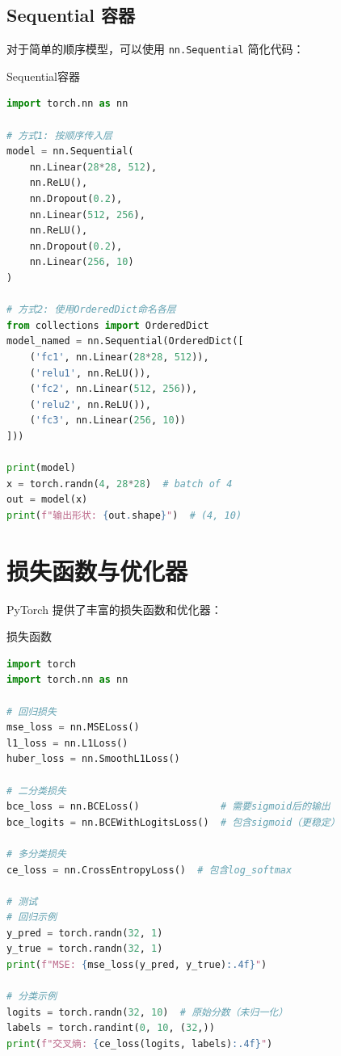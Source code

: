 \subsection{Sequential 容器}

对于简单的顺序模型，可以使用 \texttt{nn.Sequential} 简化代码：

\begin{mycode}{Sequential容器}
\begin{lstlisting}[language=Python]
import torch.nn as nn

# 方式1: 按顺序传入层
model = nn.Sequential(
    nn.Linear(28*28, 512),
    nn.ReLU(),
    nn.Dropout(0.2),
    nn.Linear(512, 256),
    nn.ReLU(),
    nn.Dropout(0.2),
    nn.Linear(256, 10)
)

# 方式2: 使用OrderedDict命名各层
from collections import OrderedDict
model_named = nn.Sequential(OrderedDict([
    ('fc1', nn.Linear(28*28, 512)),
    ('relu1', nn.ReLU()),
    ('fc2', nn.Linear(512, 256)),
    ('relu2', nn.ReLU()),
    ('fc3', nn.Linear(256, 10))
]))

print(model)
x = torch.randn(4, 28*28)  # batch of 4
out = model(x)
print(f"输出形状: {out.shape}")  # (4, 10)
\end{lstlisting}
\end{mycode}

\section{损失函数与优化器}

PyTorch 提供了丰富的损失函数和优化器：

\begin{mycode}{损失函数}
\begin{lstlisting}[language=Python]
import torch
import torch.nn as nn

# 回归损失
mse_loss = nn.MSELoss()
l1_loss = nn.L1Loss()
huber_loss = nn.SmoothL1Loss()

# 二分类损失
bce_loss = nn.BCELoss()              # 需要sigmoid后的输出
bce_logits = nn.BCEWithLogitsLoss()  # 包含sigmoid（更稳定）

# 多分类损失
ce_loss = nn.CrossEntropyLoss()  # 包含log_softmax

# 测试
# 回归示例
y_pred = torch.randn(32, 1)
y_true = torch.randn(32, 1)
print(f"MSE: {mse_loss(y_pred, y_true):.4f}")

# 分类示例
logits = torch.randn(32, 10)  # 原始分数（未归一化）
labels = torch.randint(0, 10, (32,))
print(f"交叉熵: {ce_loss(logits, labels):.4f}")
\end{lstlisting}
\end{mycode}

